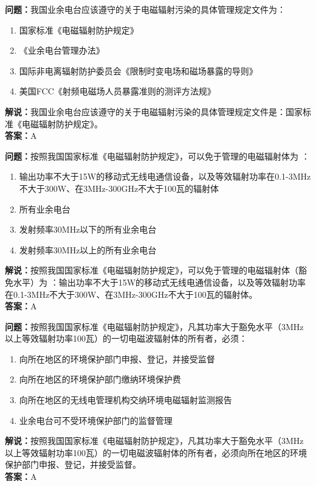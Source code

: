 \documentclass{ctexbook}%
\begin{document}
\textbf{问题：}我国业余电台应该遵守的关于电磁辐射污染的具体管理规定文件为：
\begin{enumerate}[label=\Alph*), leftmargin=3em]
\item 国家标准《电磁辐射防护规定》
\item 《业余电台管理办法》
\item 国际非电离辐射防护委员会《限制时变电场和磁场暴露的导则》
\item 美国FCC《射频电磁场人员暴露准则的测评方法规》
\end{enumerate}
\textbf{解说：}我国业余电台应该遵守的关于电磁辐射污染的具体管理规定文件是：国家标准《电磁辐射防护规定》。\\
\textbf{答案：}A

\textbf{问题：}按照我国国家标准《电磁辐射防护规定》，可以免于管理的电磁辐射体为 ：
\begin{enumerate}[label=\Alph*), leftmargin=3em]
\item 输出功率不大于15W的移动式无线电通信设备，以及等效辐射功率在0.1-3MHz不大于300W、在3MHz-300GHz不大于100瓦的辐射体
\item 所有业余电台
\item 发射频率30MHz以下的所有业余电台
\item 发射频率30MHz以上的所有业余电台
\end{enumerate}
\textbf{解说：}按照我国国家标准《电磁辐射防护规定》，可以免于管理的电磁辐射体（豁免水平）为 ：输出功率不大于15W的移动式无线电通信设备，以及等效辐射功率在0.1-3MHz不大于300W、在3MHz-300GHz不大于100瓦的辐射体。\\
\textbf{答案：}A

\textbf{问题：}按照我国国家标准《电磁辐射防护规定》，凡其功率大于豁免水平（3MHz以上等效辐射功率100瓦）的一切电磁波辐射体的所有者，必须：
\begin{enumerate}[label=\Alph*), leftmargin=3em]
\item 向所在地区的环境保护部门申报、登记，并接受监督
\item 向所在地区的环境保护部门缴纳环境保护费
\item 向所在地区的无线电管理机构交纳环境电磁辐射监测报告
\item 业余电台可不受环境保护部门的监督管理
\end{enumerate}
\textbf{解说：}按照我国国家标准《电磁辐射防护规定》，凡其功率大于豁免水平（3MHz以上等效辐射功率100瓦）的一切电磁波辐射体的所有者，必须向所在地区的环境保护部门申报、登记，并接受监督。\\
\textbf{答案：}A
\end{document}
